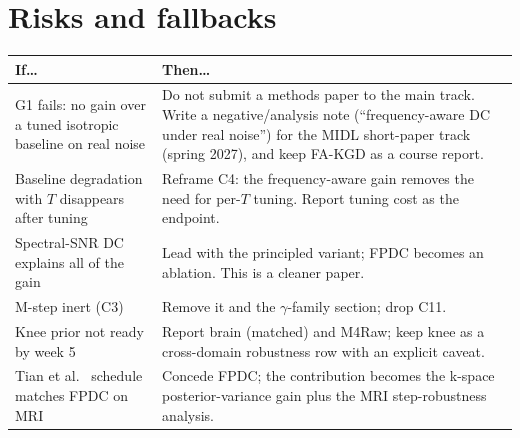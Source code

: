 \documentclass[10pt,a4paper]{article}
\begin{document}
\section{Risks and fallbacks}
\begin{center}
\small
\begin{tabularx}{\linewidth}{@{}L L@{}}
\toprule
If\ldots & Then\ldots\\
\midrule
G1 fails: no gain over a tuned isotropic baseline on real noise & Do not submit a methods paper to the main track. Write a negative/analysis note (``frequency-aware DC under real noise'') for the MIDL short-paper track (spring 2027), and keep FA-KGD as a course report.\\
Baseline degradation with $T$ disappears after tuning & Reframe C4: the frequency-aware gain removes the need for per-$T$ tuning. Report tuning cost as the endpoint.\\
Spectral-SNR DC explains all of the gain & Lead with the principled variant; FPDC becomes an ablation. This is a cleaner paper.\\
M-step inert (C3) & Remove it and the $\gamma$-family section; drop C11.\\
Knee prior not ready by week 5 & Report brain (matched) and M4Raw; keep knee as a cross-domain robustness row with an explicit caveat.\\
Tian et al.\ \cite{tian2026frequency} schedule matches FPDC on MRI & Concede FPDC; the contribution becomes the k-space posterior-variance gain plus the MRI step-robustness analysis.\\
\bottomrule
\end{tabularx}
\end{center}

\end{document}
